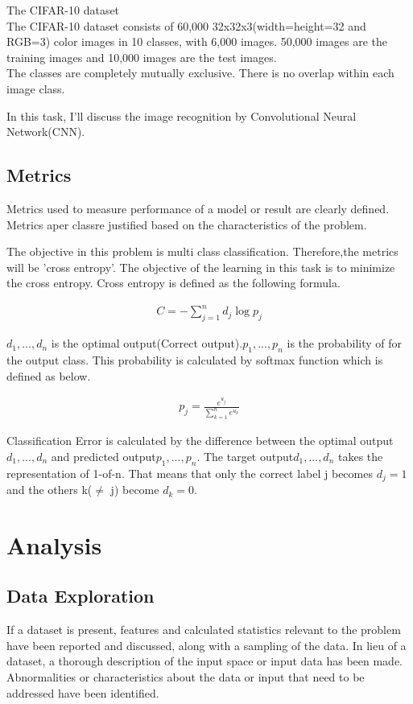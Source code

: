 \documentclass[a4paper,10pt,fleqn]{article}
\begin{document}
{\Large The CIFAR-10 dataset}\\
The CIFAR-10 dataset consists of 60,000 32x32x3(width=height=32 and RGB=3) color images in 10 classes, with 6,000 images. 50,000 images are the training images and 10,000 images are the test images.\\
The classes are completely mutually exclusive. There is no overlap within each image class.

In this task, I'll discuss the image recognition by Convolutional Neural Network(CNN).





\subsection{Metrics}
Metrics used to measure performance of a model or result are clearly defined. Metrics aper classre justified based on the characteristics of the problem.


The objective in this problem is multi class classification. Therefore,the metrics will be 'cross entropy'. The objective of the learning in this task is to minimize the cross entropy.
Cross entropy is defined as the following formula.


\begin{eqnarray}
C = -\sum_{j=1}^{n}d_{j}\log p_{j}
\end{eqnarray}

$d_{1},...,d_{n}$ is the optimal output(Correct output).$p_{1},...,p_{n}$ is the  probability of for the output class. This probability is calculated by softmax function which is defined as below.

\begin{eqnarray}
p_{j}=\frac{e^{u_{j}}}{\sum_{k=1}^{n}e^{u_{k}}}
\end{eqnarray}

Classification Error is calculated by the difference between the optimal output $d_{1},...,d_{n}$ and predicted output$p_{1},...,p_{n}$.
The target output$d_{1},...,d_{n}$ takes the representation of 1-of-n. That means that only the correct label j becomes $d_{j}=1$ and the others k($\neq$ j) become $d_{k}=0$.
\section{Analysis}
\subsection{Data Exploration}
If a dataset is present, features and calculated statistics relevant to the problem have been reported and discussed, along with a sampling of the data. In lieu of a dataset, a thorough description of the input space or input data has been made. Abnormalities or characteristics about the data or input that need to be addressed have been identified.
\end{document}
